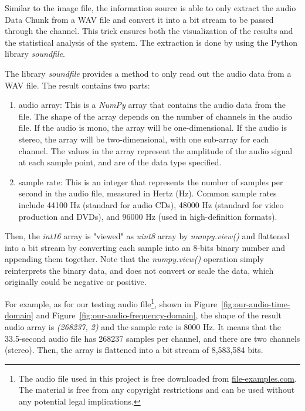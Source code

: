 \documentclass{article}
\begin{document}
Similar to the image file, the information source is able to only extract the audio Data Chunk from a WAV file and convert it into a bit stream to be passed through the channel. 
This trick ensures both the visualization of the results and the statistical analysis of the system. The extraction is done by using the Python library \textit{soundfile}.

The library \textit{soundfile} provides a method to only read out the audio data from a WAV file. The result contains two parts:
\begin{enumerate}
    \item audio array: This is a \textit{NumPy} array that contains the audio data from the file. The shape of the array depends on the number of channels in the audio file. If the audio is mono, the array will be one-dimensional. If the audio is stereo, the array will be two-dimensional, with one sub-array for each channel. The values in the array represent the amplitude of the audio signal at each sample point, and are of the data type specified.
    \item sample rate: This is an integer that represents the number of samples per second in the audio file, measured in Hertz (Hz). Common sample rates include 44100 Hz (standard for audio CDs), 48000 Hz (standard for video production and DVDs), and 96000 Hz (used in high-definition formats).
\end{enumerate}
Then, the \textit{int16} array is "viewed" as \textit{uint8} array by \textit{numpy.view()} and flattened into a bit stream by converting each sample into an 8-bits binary number and appending them together. 
Note that the \textit{numpy.view()} operation simply reinterprets the binary data, and does not convert or scale the data, which originally could be negative or positive. 

For example, as for our testing audio file\footnote{The audio file used in this project is free downloaded from \href{https://file-examples.com/index.php/sample-audio-files/sample-wav-download/}{file-examples.com}. The material is free from any copyright restrictions and can be used without any potential legal implications.}, shown in Figure~\ref{fig:our-audio-time-domain} and Figure~\ref{fig:our-audio-frequency-domain}, 
the shape of the result audio array is \textit{(268237, 2)} and the sample rate is 8000 Hz. It means that the 33.5-second audio file has 268237 samples per channel, and there are two channels (stereo). 
Then, the array is flattened into a bit stream of 8,583,584 bits.
\end{document}
